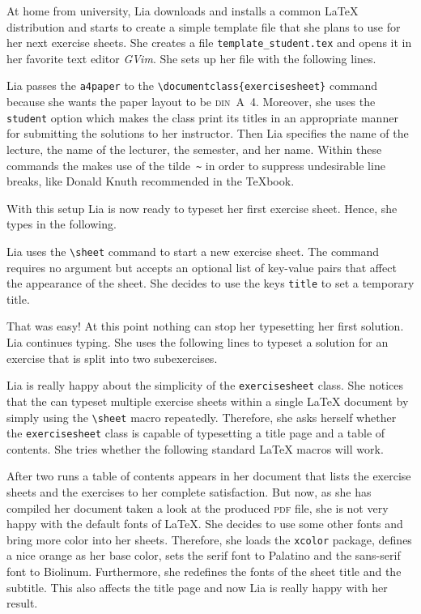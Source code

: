\documentclass{report}
\def\exercisesheet{\texttt{exercisesheet}}
\begin{document}
At home from university, Lia downloads and installs a common \LaTeX{}
distribution and starts to create a simple template file that she
plans to use for her next exercise sheets. She creates a file 
\lstinline[language=bash]{template_student.tex} and opens it in her
favorite text editor \emph{GVim}. She sets up her file with the
following lines.

Lia passes the \lstinline{a4paper} to the
\lstinline|\documentclass{exercisesheet}| command because she wants
the paper layout to be \textsc{din}~A~4. Moreover, she uses the
\lstinline{student} option which makes the class print its titles in
an appropriate manner for submitting the solutions to her instructor.
Then Lia specifies the name of the lecture, the name of the lecturer,
the semester, and her name. Within these commands the makes use of the
tilde~\lstinline{~} in order to suppress undesirable line breaks, like
Donald Knuth recommended in the \TeX{}book.

With this setup Lia is now ready to typeset her first exercise sheet.
Hence, she types in the following.

Lia uses the \lstinline|\sheet| command to start a new exercise sheet.
The command requires no argument but accepts an optional list of
key-value pairs that affect the appearance of the sheet. She decides
to use the keys \lstinline{title} to set a temporary title.

That was easy! At this point nothing can stop her typesetting her
first solution. Lia continues typing. She uses the following lines to
typeset a solution for an exercise that is split into two
subexercises.



Lia is really happy about the simplicity of the \exercisesheet{}
class. She notices that the can typeset multiple exercise sheets
within a single \LaTeX{} document by simply using the
\lstinline{\sheet} macro repeatedly. Therefore, she asks herself
whether the \exercisesheet{} class is capable of typesetting a
title page and a table of contents. She tries whether the following
standard \LaTeX{} macros will work.



After two runs a table of contents appears in her document that lists
the exercise sheets and the exercises to her complete satisfaction.
But now, as she has compiled her document taken a look at the produced
\textsc{pdf} file, she is not very happy with the default fonts of
\LaTeX{}. She decides to use some other fonts and bring more color
into her sheets. Therefore, she loads the \lstinline{xcolor} package,
defines a nice orange as her base color, sets the serif font to
Palatino and the sans-serif font to Biolinum. Furthermore, she
redefines the fonts of the sheet title and the subtitle. This also
affects the title page and now Lia is really happy with her result.

\end{document}
